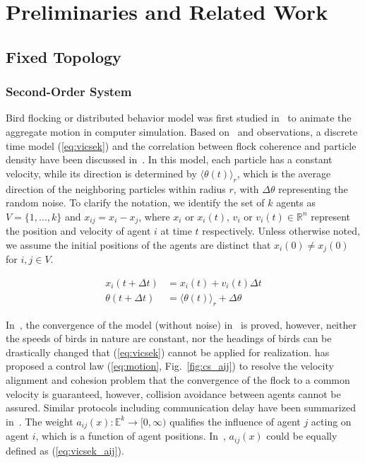 \chapter{Preliminaries and Related Work}\label{preliminaries}

\section{Fixed Topology}\label{flocking}

\subsection{Second-Order System}

Bird flocking or distributed behavior model was first studied in~\cite{Reynolds1987} to animate the aggregate motion in computer simulation. Based on~\cite{Reynolds1987} and observations, a discrete time model (\ref{eq:vicsek}) and the correlation between flock coherence and particle density have been discussed in~\cite{Vicsek1995}. In this model, each particle has a constant velocity, while its direction is determined by ${\langle\theta(t)\rangle}_r$, which is the average direction of the neighboring particles within radius $r$, with $\Delta\theta$ representing the random noise. To clarify the notation, we identify the set of $k$ agents as $V=\{1,...,k\}$ and $x_{ij}=x_i-x_j$, where $x_i$ or $x_i(t)$, $v_i$ or $v_i(t)\in\mathbb{R}^n$ represent the position and velocity of agent $i$ at time $t$ respectively. Unless otherwise noted, we assume the initial positions of the agents are distinct that $x_i(0)\neq x_j(0)$ for $i, j\in V$.

\begin{equation}\label{eq:vicsek}
\begin{aligned}
x_i(t+\Delta t)&=x_i(t)+v_i(t)\Delta t\\
\theta(t+\Delta t)&={\langle\theta(t)\rangle}_r+\Delta\theta
\end{aligned}
\end{equation}

In~\cite{Coordination2013}, the convergence of the model (without noise) in~\cite{Vicsek1995} is proved, however, neither the speeds of birds in nature are constant, nor the headings of birds can be drastically changed that (\ref{eq:vicsek}) cannot be applied for realization. \cite{CuckerSmale2007} has proposed a control law (\ref{eq:motion}, Fig.~\ref{fig:cs_aij}) to resolve the velocity alignment and cohesion problem that the convergence of the flock to a common velocity is guaranteed, however, collision avoidance between agents cannot be assured. Similar protocols including communication delay have been summarized in~\cite{moreau2004stability,ren2005consensus}. The weight $a_{ij}(x):\mathbb{E}^k\to[0,\infty)$ qualifies the influence of agent $j$ acting on agent $i$, which is a function of agent positions. In~\cite{Vicsek1995}, $a_{ij}(x)$ could be equally defined as (\ref{eq:vicsek_aij}).

